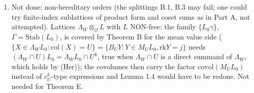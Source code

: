 \begin{enumerate}
  By-products {[}P{]}: (i) affine/congruence Siegel formula: for every coset, \(\int_{\Gamma''\backslash\mathsf G_m}\sum_{0\ne y\in(c+aL)\gamma}f(y)\,d\mu''=a^{-Dm}\int f\) (A.4); (ii) Theorem R of R15 holds for every hereditary order without (h1\(^\ell\)); (iii) Theorem B holds for arbitrary Steinitz classes of \(M\) and \(L_0\), with the single constant \(\mathrm{covol}(ML_0)^{-1}\).
\item
  Not done: non-hereditary orders (the splittings B.1, B.3 may fail; one could try finite-index sublattices of product form and coset sums as in Part A, not attempted). Lattices \(\Lambda_W\otimes_{\mathcal O}L\) with \(L\) NON-free: the family \(\{L_0\gamma\}\), \(\Gamma=\mathrm{Stab}(L_0)\), is covered by Theorem B for the mean value side (\(\{X\in\Lambda_WL_0:\mathrm{col}(X)=U\}=\{B_UY:Y\in M_UL_0,\mathrm{rk}Y=j\}\) needs \((\Lambda_W\cap U)L_0=\Lambda_WL_0\cap U^{k}\), true when \(\Lambda_W\cap U\) is a direct summand of \(\Lambda_W\), which holds by (Her)); the covolumes then carry the factor \(\mathrm{covol}(M_UL_0)\) instead of \(c_U^k\)-type expressions and Lemma 1.4 would have to be redone. Not needed for Theorem E\textquotesingle.
\end{enumerate}
